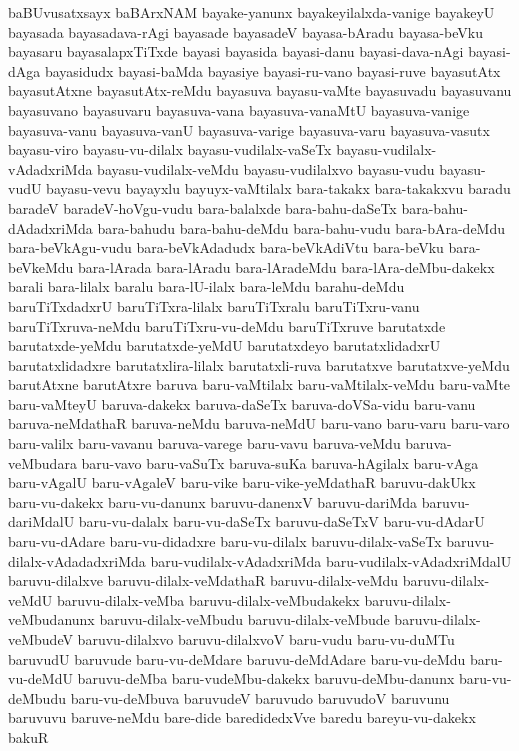 {baBUvusatxsayx
baBArxNAM
bayake-yanunx
bayakeyilalxda-vanige
bayakeyU
bayasada
bayasadava-rAgi
bayasade
bayasadeV
bayasa-bAradu
bayasa-beVku
bayasaru
bayasalapxTiTxde
bayasi
bayasida
bayasi-danu
bayasi-dava-nAgi
bayasi-dAga
bayasidudx
bayasi-baMda
bayasiye
bayasi-ru-vano
bayasi-ruve
bayasutAtx
bayasutAtxne
bayasutAtx-reMdu
bayasuva
bayasu-vaMte
bayasuvadu
bayasuvanu
bayasuvano
bayasuvaru
bayasuva-vana
bayasuva-vanaMtU
bayasuva-vanige
bayasuva-vanu
bayasuva-vanU
bayasuva-varige
bayasuva-varu
bayasuva-vasutx
bayasu-viro
bayasu-vu-dilalx
bayasu-vudilalx-vaSeTx
bayasu-vudilalx-vAdadxriMda
bayasu-vudilalx-veMdu
bayasu-vudilalxvo
bayasu-vudu
bayasu-vudU
bayasu-vevu
bayayxlu
bayuyx-vaMtilalx
bara-takakx
bara-takakxvu
baradu
baradeV
baradeV-hoVgu-vudu
bara-balalxde
bara-bahu-daSeTx
bara-bahu-dAdadxriMda
bara-bahudu
bara-bahu-deMdu
bara-bahu-vudu
bara-bAra-deMdu
bara-beVkAgu-vudu
bara-beVkAdadudx
bara-beVkAdiVtu
bara-beVku
bara-beVkeMdu
bara-lArada
bara-lAradu
bara-lAradeMdu
bara-lAra-deMbu-dakekx
barali
bara-lilalx
baralu
bara-lU-ilalx
bara-leMdu
barahu-deMdu
baruTiTxdadxrU
baruTiTxra-lilalx
baruTiTxralu
baruTiTxru-vanu
baruTiTxruva-neMdu
baruTiTxru-vu-deMdu
baruTiTxruve
barutatxde
barutatxde-yeMdu
barutatxde-yeMdU
barutatxdeyo
barutatxlidadxrU
barutatxlidadxre
barutatxlira-lilalx
barutatxli-ruva
barutatxve
barutatxve-yeMdu
barutAtxne
barutAtxre
baruva
baru-vaMtilalx
baru-vaMtilalx-veMdu
baru-vaMte
baru-vaMteyU
baruva-dakekx
baruva-daSeTx
baruva-doVSa-vidu
baru-vanu
baruva-neMdathaR
baruva-neMdu
baruva-neMdU
baru-vano
baru-varu
baru-varo
baru-valilx
baru-vavanu
baruva-varege
baru-vavu
baruva-veMdu
baruva-veMbudara
baru-vavo
baru-vaSuTx
baruva-suKa
baruva-hAgilalx
baru-vAga
baru-vAgalU
baru-vAgaleV
baru-vike
baru-vike-yeMdathaR
baruvu-dakUkx
baru-vu-dakekx
baru-vu-danunx
baruvu-danenxV
baruvu-dariMda
baruvu-dariMdalU
baru-vu-dalalx
baru-vu-daSeTx
baruvu-daSeTxV
baru-vu-dAdarU
baru-vu-dAdare
baru-vu-didadxre
baru-vu-dilalx
baruvu-dilalx-vaSeTx
baruvu-dilalx-vAdadadxriMda
baru-vudilalx-vAdadxriMda
baru-vudilalx-vAdadxriMdalU
baruvu-dilalxve
baruvu-dilalx-veMdathaR
baruvu-dilalx-veMdu
baruvu-dilalx-veMdU
baruvu-dilalx-veMba
baruvu-dilalx-veMbudakekx
baruvu-dilalx-veMbudanunx
baruvu-dilalx-veMbudu
baruvu-dilalx-veMbude
baruvu-dilalx-veMbudeV
baruvu-dilalxvo
baruvu-dilalxvoV
baru-vudu
baru-vu-duMTu
baruvudU
baruvude
baru-vu-deMdare
baruvu-deMdAdare
baru-vu-deMdu
baru-vu-deMdU
baruvu-deMba
baru-vudeMbu-dakekx
baruvu-deMbu-danunx
baru-vu-deMbudu
baru-vu-deMbuva
baruvudeV
baruvudo
baruvudoV
baruvunu
baruvuvu
baruve-neMdu
bare-dide
baredidedxVve
baredu
bareyu-vu-dakekx
bakuR
}
